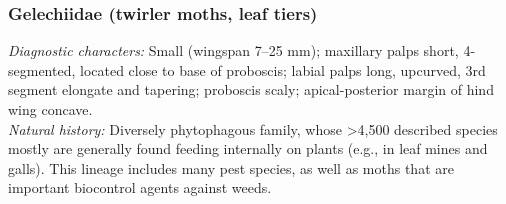 \documentclass[letterpaper, 11pt]{article}
\begin{document}
\subsubsection{Gelechiidae (twirler moths, leaf tiers)}
\noindent{}\textit{Diagnostic characters:} Small (wingspan 7--25 mm); maxillary palps short, 4-segmented, located close to base of proboscis; labial palps long, upcurved, 3rd segment elongate and tapering; proboscis scaly; apical-posterior margin of hind wing concave.\\

\noindent{}\textit{Natural history:} Diversely phytophagous family, whose \textgreater4,500 described species mostly are generally found feeding internally on plants (e.g., in leaf mines and galls). This lineage includes many pest species, as well as moths that are important biocontrol agents against weeds.
\end{document}

